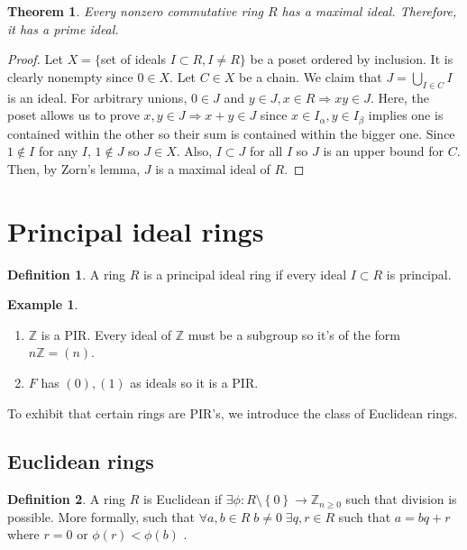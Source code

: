 \documentclass{article}
\newcommand\Z{\ensuremath{\mathbb{Z}}}
\newtheorem{theorem}{Theorem}[section]
\theoremstyle{definition}
\newtheorem{definition}{Definition}[subsection]
\newtheorem{eg}{Example}[subsection]
\theoremstyle{remark}
\theoremstyle{plain}
\begin{document}
    \begin{theorem}
        Every nonzero commutative ring \(R\) has a maximal ideal. Therefore, it has a prime ideal.
    \end{theorem}
    \begin{proof}
        Let \(X = \{\)set of ideals \(I \subset R, I \neq R \}\) be a poset ordered by inclusion. 
        It is clearly nonempty since \(0 \in X\). Let \(C \in X\) be a chain. We claim that \(J = \bigcup\limits_{I \in C}I\) is an ideal. For arbitrary unions, \(0 \in J\) and \(y\in J, x\in R \Rightarrow xy \in J\). Here, the poset allows us to prove \(x,y \in J \Rightarrow x + y \in J\) since \(x\in I_{\alpha}, y \in I_{\beta}\) implies one is contained within the other so their sum is contained within the bigger one. 
        Since \(1 \notin I\) for any \(I\), \(1 \notin J\) so \(J \in X\). Also, \(I \subset J\) for all \(I\) so \(J\) is an upper bound for \(C\).
        Then, by Zorn's lemma, \(J\) is a maximal ideal of \(R\).
    \end{proof}

\section{Principal ideal rings}

\begin{definition}
    A ring \(R\) is a principal ideal ring if every ideal \(I \subset R\) is principal. 
\end{definition}

\begin{eg}
    \begin{enumerate}
        \item \(\Z\) is a PIR. Every ideal of \(\Z\) must be a subgroup so it's of the form \(n\Z = (n)\).
        \item \(F\) has \((0), (1)\) as ideals so it is a PIR.
    \end{enumerate}
\end{eg}

To exhibit that certain rings are PIR's, we introduce the class of Euclidean rings. 

\subsection{Euclidean rings}

\begin{definition}
    A ring \(R\) is Euclidean if \(\exists \phi: R\setminus\left\{ 0 \right\} \to \Z_{n\geq 0}\) such that division is possible. More formally, such that \(\forall a,b \in R \; b\neq 0 \; \exists q,r \in R\) such that \(a = bq + r\) where \(r = 0 \) or \(\phi(r) < \phi(b)\) .
\end{definition}
\end{document}
